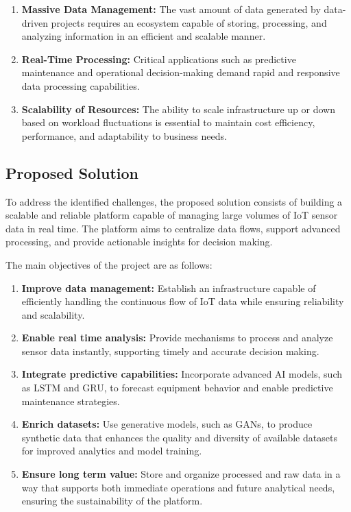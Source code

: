 \begin{enumerate}
    \item \textbf{Massive Data Management:} The vast amount of data generated by data-driven projects requires an ecosystem capable of storing, processing, and analyzing information in an efficient and scalable manner.  
  
    \item \textbf{Real-Time Processing:} Critical applications such as predictive maintenance and operational decision-making demand rapid and responsive data processing capabilities.  
    \item \textbf{Scalability of Resources:} The ability to scale infrastructure up or down based on workload fluctuations is essential to maintain cost efficiency, performance, and adaptability to business needs.  
\end{enumerate}


\subsection{Proposed Solution}

\hspace{1em}To address the identified challenges, the proposed solution consists of
building a scalable and reliable platform capable of managing large volumes of
IoT sensor data in real time. The platform aims to centralize data flows,
support advanced processing, and provide actionable insights for decision making.  

\hspace{1em}The main objectives of the project are as follows:

\begin{enumerate}
    \item \textbf{Improve data management:} Establish an infrastructure capable of efficiently handling the continuous flow of IoT data while ensuring reliability and scalability.
    \item \textbf{Enable real time analysis:} Provide mechanisms to process and analyze sensor data instantly, supporting timely and accurate decision making.
    \item \textbf{Integrate predictive capabilities:} Incorporate advanced AI models, such as LSTM and GRU, to forecast equipment behavior and enable predictive maintenance strategies.
    \item \textbf{Enrich datasets:} Use generative models, such as GANs, to produce synthetic data that enhances the quality and diversity of available datasets for improved analytics and model training.
    \item \textbf{Ensure long term value:} Store and organize processed and raw data in a way that supports both immediate operations and future analytical needs, ensuring the sustainability of the platform.
\end{enumerate}

